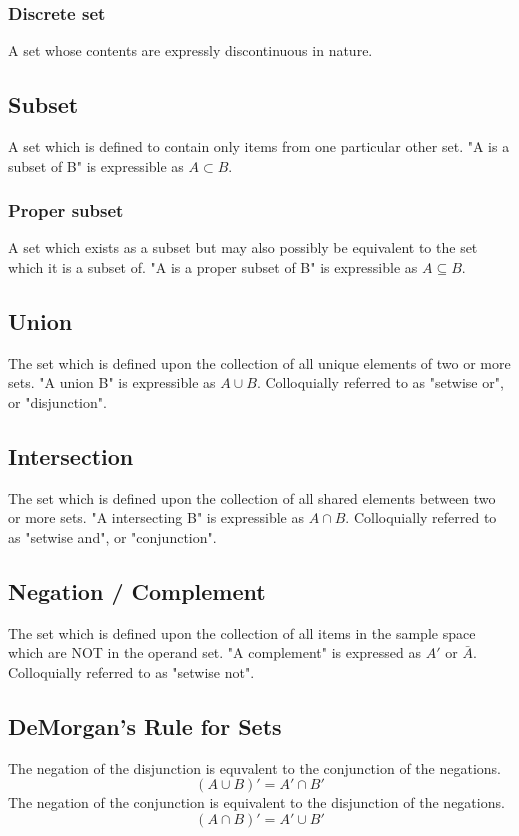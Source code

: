 \documentclass[]{article}
\begin{document}
			\subsubsection{Discrete set}
				A set whose contents are expressly discontinuous in nature.
		\subsection{Subset}
			A set which is defined to contain only items from one particular other set. "A is a subset of B" is expressible as $A \subset B$.
			\subsubsection{Proper subset}
				A set which exists as a subset but may also possibly be equivalent to the set which it is a subset of. "A is a proper subset of B" is expressible as $A \subseteq B$.
		\pagebreak
		\subsection{Union}
			The set which is defined upon the collection of all unique elements of two or more sets. "A union B" is expressible as $A \cup B$. Colloquially referred to as "setwise or", or "disjunction".
		\subsection{Intersection}
			The set which is defined upon the collection of all shared elements between two or more sets. "A intersecting B" is expressible as $A \cap B$. Colloquially referred to as "setwise and", or "conjunction".
		\subsection{Negation / Complement}
			The set which is defined upon the collection of all items in the sample space which are NOT in the operand set. "A complement" is expressed as $A'$ or $\bar{A}$. Colloquially referred to as "setwise not".
		\subsection{DeMorgan's Rule for Sets}
			The negation of the disjunction is equvalent to the conjunction of the negations.
			$$(A\cup B)' = A' \cap B'$$
			The negation of the conjunction is equivalent to the disjunction of the negations.
			$$(A\cap B)' = A' \cup B'$$
		
	
	\pagebreak
\end{document}

